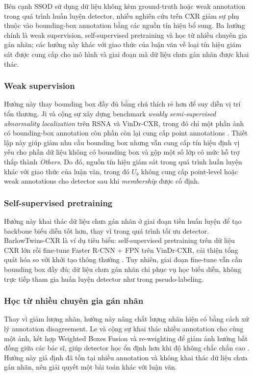\documentclass[pdflatex,sn-mathphys-num]{sn-jnl}%
\theoremstyle{thmstyleone}%
\theoremstyle{thmstyletwo}%
\theoremstyle{thmstylethree}%
\begin{document}
Bên cạnh SSOD sử dụng dữ liệu không kèm ground-truth hoặc weak annotation trong quá trình huấn luyện detector, nhiều nghiên cứu trên CXR giảm sự phụ thuộc vào bounding-box annotation bằng các nguồn tín hiệu bổ sung. Ba hướng chính là weak supervision, self-supervised pretraining và học từ nhiều chuyên gia gán nhãn; các hướng này khác với giao thức của luận văn về loại tín hiệu giám sát được cung cấp cho mô hình và giai đoạn mà dữ liệu chưa gán nhãn được khai thác.
 
\subsubsection*{Weak supervision}
Hướng này thay bounding box đầy đủ bằng chú thích rẻ hơn để suy diễn vị trí tổn
thương. Ji và cộng sự xây dựng benchmark \textit{weakly semi-supervised
abnormality localization} trên RSNA và VinDr-CXR, trong đó chỉ một phần ảnh có
bounding-box annotation còn phần còn lại cung cấp point annotations
\cite{ji2022benchmark}. Thiết lập này giúp giảm nhu cầu bounding box nhưng vẫn
cung cấp tín hiệu định vị yếu cho phần dữ liệu không có bounding box và gộp một
số lớp có mức hỗ trợ thấp thành \textit{Others}. Do đó, nguồn tín hiệu giám sát trong quá trình
huấn luyện khác với giao thức của luận văn, trong đó \(U_b\) không cung cấp
point-level hoặc weak annotations cho detector sau khi \textit{membership}
được cố định.
 
\subsubsection*{Self-supervised pretraining}
Hướng này khai thác dữ liệu chưa gán nhãn ở giai đoạn tiền huấn luyện để tạo
backbone biểu diễn tốt hơn, thay vì trong quá trình tối ưu detector. BarlowTwins-CXR
là ví dụ tiêu biểu: self-supervised pretraining trên dữ liệu CXR lớn rồi fine-tune
Faster R-CNN + FPN trên VinDr-CXR, cải thiện tổng quát hóa so với khởi tạo thông
thường \cite{sheng2024barlowtwins}. Tuy nhiên, giai đoạn fine-tune vẫn cần bounding
box đầy đủ; dữ liệu chưa gán nhãn chỉ phục vụ học biểu diễn, không trực tiếp tham
gia huấn luyện detector như trong pseudo-labeling.
 
\subsubsection*{Học từ nhiều chuyên gia gán nhãn}
Thay vì giảm lượng nhãn, hướng này nâng chất lượng nhãn hiện có bằng cách xử lý
annotation disagreement. Le và cộng sự khai thác nhiều annotation cho cùng một ảnh,
kết hợp Weighted Boxes Fusion và re-weighting để giảm ảnh hưởng bất đồng giữa các
bác sĩ, giúp detector học ổn định hơn khi độ không chắc chắn cao \cite{le2023learning}.
Hướng này giả định đã tồn tại nhiều annotation và không khai thác dữ liệu chưa gán
nhãn, nên giải quyết một bài toán khác với luận văn.
 
\end{document}
